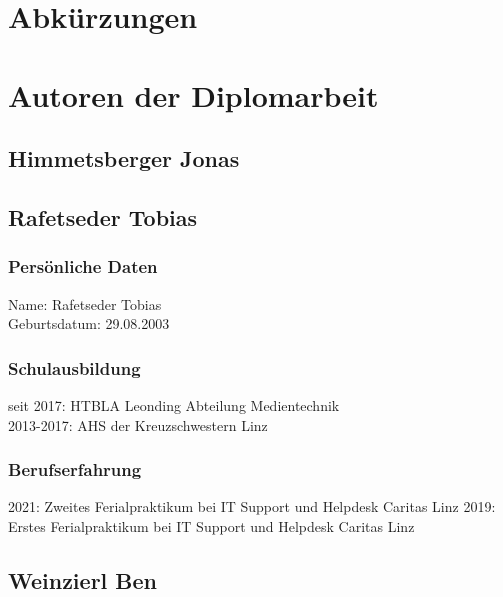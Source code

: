 
\section{Abkürzungen}
\section{Autoren der Diplomarbeit}
\subsection{Himmetsberger Jonas}
\subsection{Rafetseder Tobias}
\subsubsection{Persönliche Daten}
Name: Rafetseder Tobias \\
Geburtsdatum: 29.08.2003 \\
\subsubsection{Schulausbildung}
seit 2017: HTBLA Leonding Abteilung Medientechnik \\
2013-2017: AHS der Kreuzschwestern Linz
\subsubsection{Berufserfahrung}
2021: Zweites Ferialpraktikum bei IT Support und Helpdesk Caritas Linz 
2019: Erstes Ferialpraktikum bei IT Support und Helpdesk Caritas Linz 
\subsection{Weinzierl Ben}
